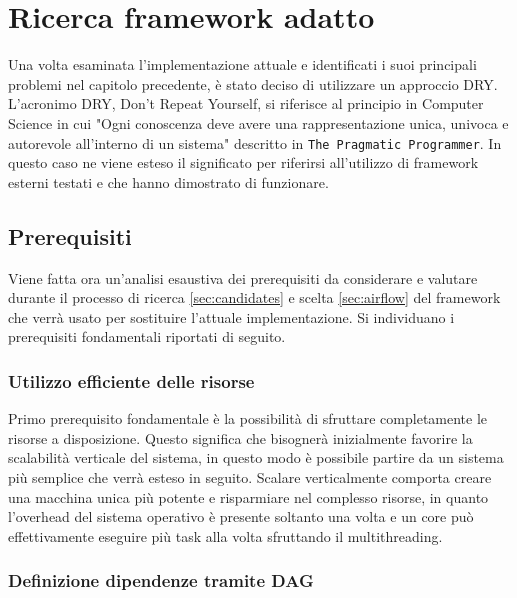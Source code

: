\chapter{Ricerca framework adatto}
\label{sec:ricerca_framework}

Una volta esaminata l'implementazione attuale e identificati i suoi principali
problemi nel capitolo precedente, è stato deciso di utilizzare un approccio DRY.
L'acronimo DRY, Don't Repeat Yourself, si riferisce al principio in Computer
Science in cui "Ogni conoscenza deve avere una rappresentazione unica, univoca e
autorevole all’interno di un sistema" descritto in \texttt{The Pragmatic
Programmer}\cite{thomas2019pragmatic}. In questo caso ne viene esteso il
significato per riferirsi all'utilizzo di framework esterni testati e che hanno
dimostrato di funzionare.

\section{Prerequisiti}
\label{sec:prerequisiti}

Viene fatta ora un'analisi esaustiva dei prerequisiti da considerare e valutare durante
il processo di ricerca \ref{sec:candidates} e scelta \ref{sec:airflow} del framework
che verrà usato per sostituire l'attuale implementazione. Si individuano i
prerequisiti fondamentali riportati di seguito.

\subsection{Utilizzo efficiente delle risorse}
\label{sub:resource_usage}

Primo prerequisito fondamentale è la possibilità di sfruttare completamente le risorse
a disposizione. Questo significa che bisognerà inizialmente favorire la
scalabilità verticale del sistema, in questo modo è possibile partire da un sistema
più semplice che verrà esteso in seguito. Scalare verticalmente comporta creare
una macchina unica più potente e risparmiare nel complesso risorse, in quanto l'overhead
del sistema operativo è presente soltanto una volta e un core può effettivamente
eseguire più task alla volta sfruttando il multithreading.

\subsection{Definizione dipendenze tramite DAG}
\label{sub:deps_definition}

